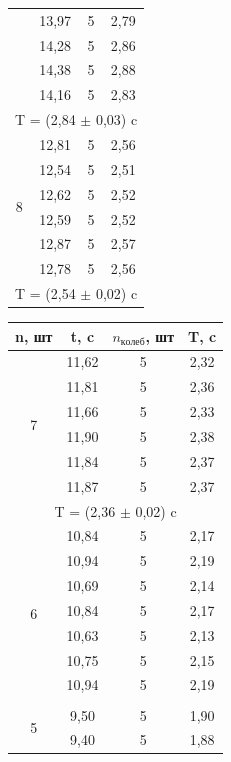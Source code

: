 \documentclass[a4paper,12pt]{article}
\begin{document}
\begin{center}
\begin{tabular}{|c|c|c|c|}
	\cline{2-4} & 13,97 & 5 & 2,79 \\
	\cline{2-4} & 14,28 & 5 & 2,86 \\
	\cline{2-4} & 14,38 & 5 & 2,88 \\
	\cline{2-4} & 14,16 & 5 & 2,83 \\
	\hline
	\multicolumn{4}{|c|}{T = (2,84 $\pm$ 0,03) c} \\
	\hline
	\multirow{6}{*}{8} & 12,81 & 5 & 2,56 \\
	\cline{2-4} & 12,54 & 5 & 2,51 \\
	\cline{2-4} & 12,62 & 5 & 2,52 \\
	\cline{2-4} & 12,59 & 5 & 2,52 \\
	\cline{2-4} & 12,87 & 5 & 2,57 \\
	\cline{2-4} & 12,78 & 5 & 2,56 \\
	\hline
	\multicolumn{4}{|c|}{T = (2,54 $\pm$ 0,02) c} \\
	\hline
\end{tabular}
\quad
 \begin{tabular}{|c|c|c|c|}
     \hline
     n, шт & t, c & $n_{колеб}$, шт & T, c \\
     \hline
     \multirow{6}{*}{7} & 11,62 & 5 & 2,32 \\
     \cline{2-4} & 11,81 & 5 & 2,36 \\
     \cline{2-4} & 11,66 & 5 & 2,33 \\
     \cline{2-4} & 11,90 & 5 & 2,38 \\
     \cline{2-4} & 11,84 & 5 & 2,37 \\
     \cline{2-4} & 11,87 & 5 & 2,37 \\
     \hline
     \multicolumn{4}{|c|}{T = (2,36 $\pm$ 0,02) c} \\
     \hline
     \multirow{8}{*}{6} & 10,84 & 5 & 2,17 \\
     \cline{2-4} & 10,94 & 5 & 2,19 \\
     \cline{2-4} & 10,69 & 5 & 2,14 \\
     \cline{2-4} & 10,84 & 5 & 2,17 \\
     \cline{2-4} & 10,63 & 5 & 2,13 \\
     \cline{2-4} & 10,75 & 5 & 2,15 \\
     \cline{2-4} & 10,94 & 5 & 2,19 \\
     \hline
     \multicolumn{4}{|c|}{T = (2,16 $\pm$ 0,02) c} \\
     \hline
     \multirow{6}{*}{5} & 9,50 & 5 & 1,90 \\
     \cline{2-4} & 9,40 & 5 & 1,88 \\

\end{tabular}
\end{center}
\end{document}
